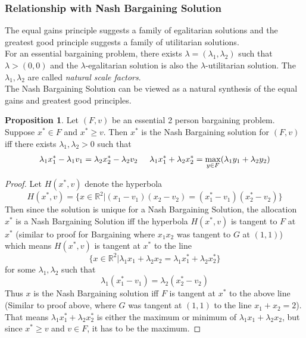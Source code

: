 \documentclass{article}
\theoremstyle{definition}
\newtheorem{prop}{Proposition}[section]
\begin{document}
\subsubsection*{Relationship with Nash Bargaining Solution}
The equal gains principle suggests a family of egalitarian solutions and the greatest good principle suggests a family of utilitarian solutions.\\
For an essential bargaining problem, there exists $\lambda = (\lambda_1,\lambda_2)$ such that $\lambda >(0,0)$ and the $\lambda$-egalitarian solution is also the $\lambda$-utilitarian solution. The $\lambda_1,\lambda_2$ are called \textit{natural scale factors}.\\
The Nash Bargaining Solution can be viewed as a natural synthesis of the equal gains and greatest good principles.
\begin{prop}
Let $(F,v)$ be an essential 2 person bargaining problem. Suppose $x^*\in F$ and $x^* \geq v$. Then $x^*$ is the Nash Bargaining solution for $(F,v)$ iff there exists $\lambda_1,\lambda_2 >0$ such that $$\lambda_1x_1^* - \lambda_1v_1 = \lambda_2x_2^* - \lambda_2v_2 \hspace{5mm} \lambda_1x_1^* + \lambda_2x_2^* = \max_{y\in F} (\lambda_1y_1 + \lambda_2y_2)$$
\end{prop}
\begin{proof}
Let $H(x^*,v)$ denote the hyperbola $$H(x^*,v) = \{x\in \mathbb{R}^2|(x_1-v_1)(x_2-v_2) = (x_1^*-v_1)(x_2^*-v_2)\}$$
Then since the solution is unique for a Nash Bargaining Solution, the allocation $x^*$ is a Nash Bargaining Solution iff the hyperbola $H(x^*,v)$ is tangent to $F$ at $x^*$ (similar to proof for Bargaining where $x_1x_2$ was tangent to $G$ at $(1,1)$) which means $H(x^*,v)$ is tangent at $x^*$ to the line $$\{x\in \mathbb{R}^2| \lambda_1x_1 + \lambda_2x_2  = \lambda_1x_1^* + \lambda_2x_2^*\}$$ for some $\lambda_1,\lambda_2$ such that $$\lambda_1(x_1^*-v_1) = \lambda_2(x_2^*-v_2)$$ Thus $x$ is the Nash Bargaining solution iff $F$ is tangent at $x^*$ to the above line (Similar to proof above, where $G$ was tangent at $(1,1)$ to the line $x_1+x_2 = 2$). That means $\lambda_1x_1^* + \lambda_2x_2^*$ is either the maximum or minimum of $\lambda_1x_1 + \lambda_2x_2$, but since $x^*\geq v$ and $v\in F$, it has to be the maximum.  
\end{proof}
\end{document}
